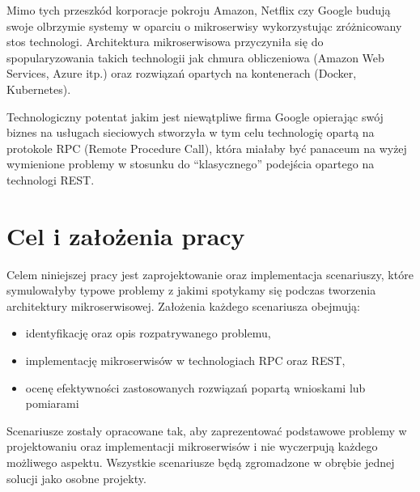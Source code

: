 Mimo tych przeszkód korporacje pokroju Amazon, Netflix czy Google budują swoje olbrzymie systemy w oparciu o mikroserwisy wykorzystując zróżnicowany stos technologi. Architektura mikroserwisowa przyczyniła się do spopularyzowania takich technologii jak chmura obliczeniowa (Amazon Web Services, Azure itp.) oraz rozwiązań opartych na kontenerach (Docker, Kubernetes). \par Technologiczny potentat jakim jest niewątpliwe firma Google opierając swój biznes na usługach sieciowych stworzyła w tym celu technologię opartą na protokole RPC (Remote Procedure Call), która miałaby być panaceum na wyżej wymienione problemy w stosunku do \enquote{klasycznego} podejścia opartego na technologi REST.
\section{Cel i założenia pracy}
Celem niniejszej pracy jest zaprojektowanie oraz implementacja scenariuszy, które symulowałyby typowe problemy z jakimi spotykamy się podczas tworzenia architektury mikroserwisowej. Założenia każdego scenariusza obejmują:
\begin{itemize}
	\item identyfikację oraz opis rozpatrywanego problemu,
	\item implementację mikroserwisów w technologiach RPC oraz REST,
	\item ocenę efektywności zastosowanych rozwiązań popartą wnioskami lub pomiarami
\end{itemize}
\par Scenariusze zostały opracowane tak, aby zaprezentować podstawowe problemy w projektowaniu oraz implementacji mikroserwisów i nie wyczerpują każdego możliwego aspektu. Wszystkie scenariusze będą zgromadzone w obrębie jednej solucji jako osobne projekty.
